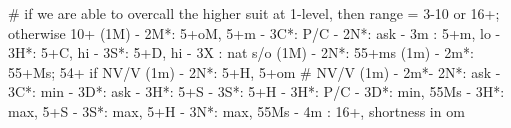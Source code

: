 # if we are able to overcall the higher suit at 1-level, then range = 3-10 or 16+; otherwise 10+
(1M) - 2M*: 5+oM, 5+m
          - 3C*: P/C
          - 2N*: ask
               - 3m : 5+m, lo
               - 3H*: 5+C, hi
               - 3S*: 5+D, hi
          - 3X : nat s/o
(1M) - 2N*: 55+ms
(1m) - 2m*: 55+Ms; 54+ if NV/V 
(1m) - 2N*: 5+H, 5+om
# NV/V
(1m) - 2m*- 2N*: ask
               - 3C*: min
                    - 3D*: ask
                         - 3H*: 5+S
                         - 3S*: 5+H
                    - 3H*: P/C
               - 3D*: min, 55Ms
               - 3H*: max, 5+S
               - 3S*: max, 5+H
               - 3N*: max, 55Ms
               - 4m : 16+, shortness in om